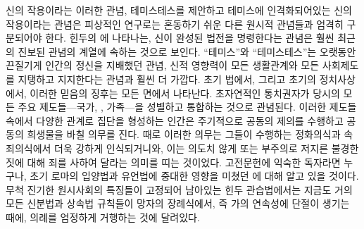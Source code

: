 신의 작용이라는 이러한 관념,
테미스테스를 제안하고 테미스에 인격화되어있는 신의 작용이라는 관념은
피상적인 연구로는 혼동하기 쉬운
다른 원시적 관념들과 엄격히 구분되어야 한다.
힌두의 에 나타나는, 신이 완성된 법전을 명령한다는 관념은
훨씬 최근의 진보된 관념의 계열에 속하는 것으로 보인다.
``테미스''와 ``테미스테스''는
오랫동안 끈질기게 인간의 정신을 지배했던 관념,
신적 영향력이 모든 생활관계와 모든 사회제도를 지탱하고 지지한다는 관념과
훨씬 더 가깝다.
초기 법에서, 그리고 초기의 정치사상에서,
이러한 믿음의 징후는 모든 면에서 나타난다.
초자연적인 통치권자가 당시의 모든 주요 제도들---국가, , 가족---을
성별하고 통합하는 것으로 관념된다.
이러한 제도들 속에서 다양한 관계로 집단을 형성하는 인간은
주기적으로 공동의 제의를 수행하고 공동의 희생물을 바칠 의무를 진다.
때로 이러한 의무는
그들이 수행하는 정화의식과 속죄의식에서
더욱 강하게 인식되거니와,
이는 의도치 않게 또는 부주의로 저지른 불경한 짓에 대해 죄를
사하여 달라는 의미를 띠는 것이었다.
고전문헌에 익숙한 독자라면 누구나,
초기 로마의 입양법과 유언법에 중대한 영향을 미쳤던
에 대해 알고 있을 것이다.
무척 진기한 원시사회의 특징들이 고정되어 남아있는
힌두 관습법에서는 지금도 거의 모든 신분법과 상속법 규칙들이
망자의 장례식에서,
즉 가의 연속성에 단절이 생기는 때에,
의례를 엄정하게 거행하는 것에 달려있다.

